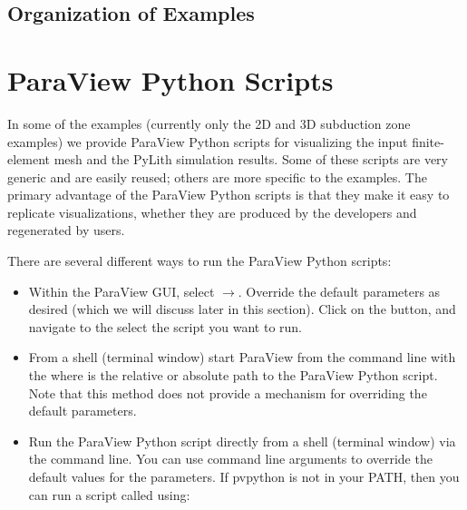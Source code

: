 \subsection{Organization of Examples}


\section{ParaView Python Scripts}
\label{sec:ParaView:Python:scripts}

In some of the examples (currently only the 2D and 3D subduction zone
examples) we provide ParaView Python scripts for visualizing the input
finite-element mesh and the PyLith simulation results. Some of these
scripts are very generic and are easily reused; others are more
specific to the examples. The primary advantage of the ParaView Python
scripts is that they make it easy to replicate visualizations, whether
they are produced by the developers and regenerated by users.

There are several different ways to run the ParaView Python scripts:
\begin{itemize}
\item Within the ParaView GUI, select
  $\rightarrow$. Override the default
  parameters as desired (which we will discuss later in this
  section). Click on the  button, and navigate to the
  select the script you want to run.
\item From a shell (terminal window) start ParaView from the command
  line with the  where
   is the relative or absolute path to the ParaView
  Python script. Note that this method does not provide a mechanism
  for overriding the default parameters.
\item Run the ParaView Python script directly from a shell (terminal
  window) via the command line. You can use command line arguments to
  override the default values for the parameters. If pvpython is not
  in your PATH, then you can run a script called
   using:
\end{itemize}


